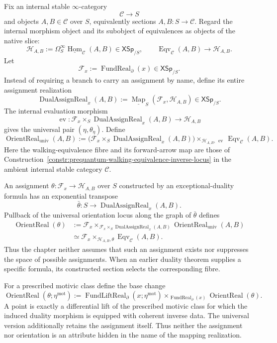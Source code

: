 \begin{construction}
\label{constr:prequantum-orientation-inverse-locus}
Fix an internal stable $\infty$-category
\[
\mathcal C\longrightarrow S
\]
and objects $A,B\in\mathcal C$ over $S$, equivalently sections
$A,B:S\to\mathcal C$.  Regard the internal morphism object and its
subobject of equivalences as objects of the native slice:
\[
\mathcal H_{A,B}
:=
\Omega_S^\infty
\underline{\operatorname{Hom}}_{\mathcal C}(A,B)
\in\mathsf{XSp}_{/S},
\qquad
\operatorname{Eqv}_{\mathcal C}(A,B)
\longrightarrow
\mathcal H_{A,B}.
\]
Let
\[
\mathcal F_x:=\operatorname{FundReal}_{\partial}(x)
\in\mathsf{XSp}_{/S}.
\]
Instead of requiring a branch to carry an assignment by name, define its entire
assignment realization
\[
\boxed{
\operatorname{DualAssignReal}_x(A,B)
:=
\underline{\operatorname{Map}}_S(\mathcal F_x,\mathcal H_{A,B})
\in\mathsf{XSp}_{/S}.
}
\]
The internal evaluation morphism
\[
\operatorname{ev}:
\mathcal F_x\times_S\operatorname{DualAssignReal}_x(A,B)
\longrightarrow\mathcal H_{A,B}
\]
gives the universal pair $(\eta,\theta_\eta)$.  Define
\[
\boxed{
\operatorname{OrientReal}_{\mathrm{univ}}(A,B)
:=
\bigl(\mathcal F_x\times_S\operatorname{DualAssignReal}_x(A,B)\bigr)
\mathop{\times}_{\mathcal H_{A,B},\,\operatorname{ev}}
\operatorname{Eqv}_{\mathcal C}(A,B).
}
\]
Here the walking-equivalence fibre and its forward-arrow map are those of
Construction~\ref{constr:prequantum-walking-equivalence-inverse-locus} in the
ambient internal stable category $\mathcal C$.

An assignment $\theta:\mathcal F_x\to\mathcal H_{A,B}$ over $S$ constructed by
an exceptional-duality formula has an exponential transpose
\[
\bar\theta:S\longrightarrow\operatorname{DualAssignReal}_x(A,B).
\]
Pullback of the universal orientation locus along the graph of $\bar\theta$
defines
\[
\begin{aligned}
\operatorname{OrientReal}(\theta)
&:=
\mathcal F_x
\mathop{\times}_{\mathcal F_x\times_S
\operatorname{DualAssignReal}_x(A,B)}
\operatorname{OrientReal}_{\mathrm{univ}}(A,B)\\
&\simeq
\mathcal F_x\mathop{\times}_{\mathcal H_{A,B},\theta}
\operatorname{Eqv}_{\mathcal C}(A,B).
\end{aligned}
\]
Thus the chapter neither assumes that such an assignment exists nor suppresses
the space of possible assignments.  When an earlier duality theorem supplies a
specific formula, its constructed section selects the corresponding fibre.

For a prescribed motivic class define the base change
\[
\boxed{
\operatorname{OrientReal}(\theta;\eta^{\mathrm{mot}})
:=
\operatorname{FundLiftReal}_{\partial}(x;\eta^{\mathrm{mot}})
\times_{\operatorname{FundReal}_{\partial}(x)}
\operatorname{OrientReal}(\theta).
}
\]
A point is exactly a differential lift of the prescribed motivic class for
which the induced duality morphism is equipped with coherent inverse data.
The universal version additionally retains the assignment itself.  Thus neither
the assignment nor orientation is an attribute hidden in the name of the
mapping realization.
\end{construction}


